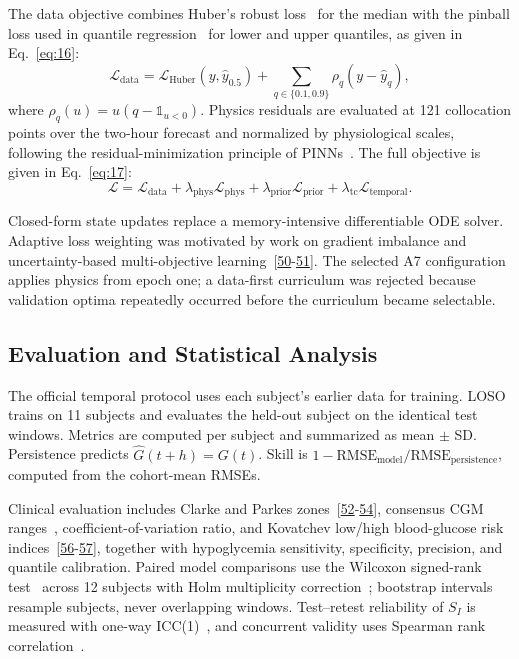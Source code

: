\documentclass[journal]{IEEEtran}
\begin{document}
The data objective combines Huber's robust loss~\cite{ref39} for the median with the pinball loss used in quantile regression~\cite{ref40} for lower and upper quantiles, as given in Eq.~\eqref{eq:16}:
\begin{equation}
\mathcal{L}_{\text{data}} = \mathcal{L}_{\text{Huber}}(y, \hat{y}_{0.5}) + \sum_{q \in \{0.1, 0.9\}} \rho_q(y - \hat{y}_q),
\label{eq:16}
\end{equation}
where $\rho_q(u) = u(q - \mathbb{1}_{u<0})$. Physics residuals are evaluated at 121 collocation points over the two-hour forecast and normalized by physiological scales, following the residual-minimization principle of PINNs~\cite{ref8}. The full objective is given in Eq.~\eqref{eq:17}:
\begin{equation}
\mathcal{L} = \mathcal{L}_{\text{data}} + \lambda_{\text{phys}} \mathcal{L}_{\text{phys}} + \lambda_{\text{prior}} \mathcal{L}_{\text{prior}} + \lambda_{\text{tc}} \mathcal{L}_{\text{temporal}}.
\label{eq:17}
\end{equation}

Closed-form state updates replace a memory-intensive differentiable ODE solver. Adaptive loss weighting was motivated by work on gradient imbalance and uncertainty-based multi-objective learning~[\hyperref[ref41label]{50}-\hyperref[ref42label]{51}]. The selected A7 configuration applies physics from epoch one; a data-first curriculum was rejected because validation optima repeatedly occurred before the curriculum became selectable.

\subsection{Evaluation and Statistical Analysis}

The official temporal protocol uses each subject's earlier data for training. LOSO trains on 11 subjects and evaluates the held-out subject on the identical test windows. Metrics are computed per subject and summarized as mean $\pm$ SD\@. Persistence predicts $\hat{G}(t+h) = G(t)$. Skill is $1 - \text{RMSE}_{\text{model}}/\text{RMSE}_{\text{persistence}}$, computed from the cohort-mean RMSEs.

Clinical evaluation includes Clarke and Parkes zones~[\hyperref[ref43label]{52}-\hyperref[ref45label]{54}], consensus CGM ranges~\cite{ref52}, coefficient-of-variation ratio, and Kovatchev low/high blood-glucose risk indices~[\hyperref[ref46label]{56}-\hyperref[ref47label]{57}], together with hypoglycemia sensitivity, specificity, precision, and quantile calibration. Paired model comparisons use the Wilcoxon signed-rank test~\cite{ref48} across 12 subjects with Holm multiplicity correction~\cite{ref49}; bootstrap intervals resample subjects, never overlapping windows. Test--retest reliability of $S_I$ is measured with one-way ICC(1)~\cite{ref50}, and concurrent validity uses Spearman rank correlation~\cite{ref51}.
\end{document}
